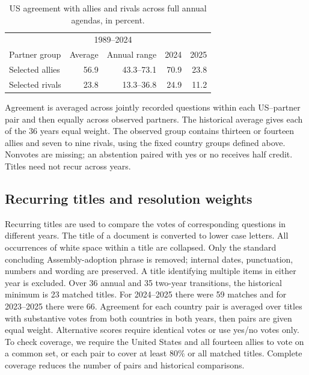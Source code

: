 \documentclass[10pt,authoryear]{elsarticle}
\begin{document}
\begin{table}[ht]
\centering\small
\caption{US agreement with allies and rivals across full annual agendas, in percent.}
\label{tab:annual_agreement_levels}
\begin{tabular}{lrrrr}
\toprule
 & \multicolumn{2}{c}{1989--2024} & & \\
Partner group & Average & Annual range & 2024 & 2025 \\
\midrule
Selected allies & 56.9 & 43.3--73.1 & 70.9 & 23.8 \\
Selected rivals & 23.8 & 13.3--36.8 & 24.9 & 11.2 \\
\bottomrule
\end{tabular}
\begin{minipage}{.95\textwidth}
\footnotesize Agreement is averaged across jointly recorded questions within each US--partner pair and then equally across observed partners. The historical average gives each of the 36 years equal weight. The observed group contains thirteen or fourteen allies and seven to nine rivals, using the fixed country groups defined above. Nonvotes are missing; an abstention paired with yes or no receives half credit. Titles need not recur across years.
\end{minipage}
\end{table}

\subsection{Recurring titles and resolution weights}

Recurring titles are used to compare the votes of corresponding questions in different years. The title of a document is converted to lower case letters. All occurrences of white space within a title are collapsed. Only the standard concluding Assembly-adoption phrase is removed; internal dates, punctuation, numbers and wording are preserved. A title identifying multiple items in either year is excluded. Over 36 annual and 35 two-year transitions, the historical minimum is 23 matched titles. For 2024–2025 there were 59 matches and for 2023–2025 there were 66. Agreement for each country pair is averaged over titles with substantive votes from both countries in both years, then pairs are given equal weight. Alternative scores require identical votes or use yes/no votes only. To check coverage, we require the United States and all fourteen allies to vote on a common set, or each pair to cover at least $80\%$ or all matched titles. Complete coverage reduces the number of pairs and historical comparisons.
\end{document}
